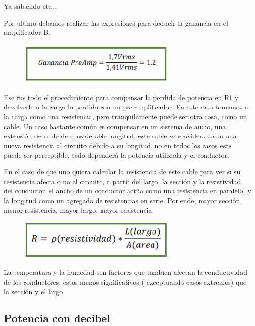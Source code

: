\documentclass[../main.tex]{subfiles}
\begin{document}
	Ya sabiendo etc... 

	Por ultimo debemos realizar las expresiones para deducir la ganancia en el amplificador B.

	\begin{figure}[H]
		\includegraphics[width=0.7\textwidth]{imagen13.png}
		\centering
	\end{figure}

	Ese fue todo el procedimiento para compensar la perdida de potencia en R1 y 
	devolverle a la carga lo perdido con un pre amplificador. En este caso 
	tomamos a la carga como una resistencia, pero tranquilamente puede ser otra 
	cosa, como un cable. Un caso bastante común es compensar en un sistema de 
	audio, una extensión de cable de considerable longitud, este cable se 
	considera como una nueva resistencia al circuito debido a su longitud, no en 
	todos los casos este puede ser perceptible, todo dependerá la potencia 
	utilizada y el conductor.

	En el caso de que uno quiera calcular la resistencia de este cable para ver si su 
	resistencia afecta o no al circuito, a partir del largo, la sección y la 
	resistividad del conductor. el ancho de un conductor actúa como una resistencia en 
	paralelo, y la longitud como un agregado de resistencias en serie. Por ende, mayor 
	sección, menor resistencia, mayor largo, mayor resistencia.

	\begin{figure}[H]
		\includegraphics[width=0.7\textwidth]{imagen14.png}
		\centering
	\end{figure}
	La temperatura y la humedad son factores que tambien afectan la conductividad 
	de los conductores, estos menos significativos ( exceptuando casos extremos) 
	que la sección y el largo

	\subsection{Potencia con decibel}	
\end{document}
